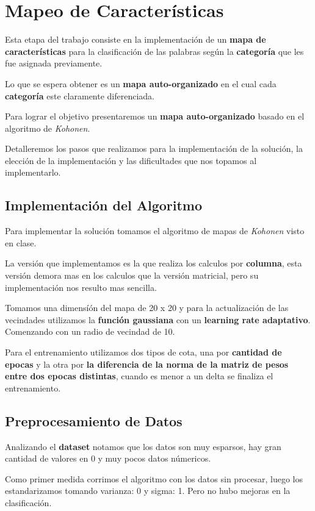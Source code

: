 
\section{Mapeo de Características}

Esta etapa del trabajo consiste en la implementación de un \textbf{mapa
de características} para la clasificación de las palabras según
la \textbf{categoría} que les fue asignada previamente.

Lo que se espera obtener es un \textbf{mapa auto-organizado} en el cual
cada \textbf{categoría} este claramente diferenciada.

Para lograr el objetivo presentaremos un \textbf{mapa auto-organizado} 
basado en el algoritmo de \emph{Kohonen}.

Detalleremos los pasos que realizamos para la implementación de la solución,
la elección de la implementación y las dificultades que nos topamos al
implementarlo.


\subsection{Implementación del Algoritmo}

Para implementar la solución tomamos el algoritmo de mapas
de \emph{Kohonen} visto en clase.

La versión que implementamos es la que realiza los calculos 
por \textbf{columna}, esta versión demora mas en los calculos 
que la versión matricial, pero su implementación nos resulto mas 
sencilla.

Tomamos una dimensíón del mapa de 20 x 20 y para la actualización 
de las vecindades utilizamos la \textbf{función gaussiana} con un 
\textbf{learning rate adaptativo}. Comenzando con un radio de 
vecindad de 10.

Para el entrenamiento utilizamos dos tipos de cota, una por \textbf{cantidad
de epocas} y la otra por \textbf{la diferencia de la norma de la matriz de pesos
entre dos epocas distintas}, cuando es menor a un delta se finaliza 
el entrenamiento.


\subsection{Preprocesamiento de Datos}

Analizando el \textbf{dataset} notamos que los datos son muy esparsos, hay gran cantidad
de valores en 0 y muy pocos datos númericos.

Como primer medida corrimos el algoritmo con los datos sin procesar, luego
los estandarizamos tomando varianza: 0 y sigma: 1. Pero no hubo mejoras en la
clasificación.

